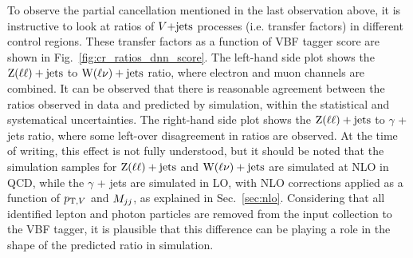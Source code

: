To observe the partial cancellation mentioned in the last observation above, it is instructive to
look at ratios of $V\text{+jets}$ processes (i.e. transfer factors) in different control regions.
These transfer factors as a function of VBF tagger score are shown in
Fig.~\ref{fig:cr_ratios_dnn_score}. The left-hand side plot shows the $\mathrm{Z}(\ell\ell)+\textrm{jets}$ to $\mathrm{W}(\ell\nu)+\textrm{jets}$ ratio,
where electron and muon channels are combined. It can be observed that there is reasonable agreement between
the ratios observed in data and predicted by simulation, within the statistical and systematical uncertainties.
The right-hand side plot shows the $\mathrm{Z}(\ell\ell)+\textrm{jets}$ to $\gamma$ + jets ratio, where some left-over disagreement in ratios
are observed. At the time of writing, this effect is not fully understood, but it should be noted that 
the simulation samples for $\mathrm{Z}(\ell\ell)+\textrm{jets}$ and $\mathrm{W}(\ell\nu)+\textrm{jets}$ are simulated at NLO in QCD, while the $\gamma$ + jets are
simulated in LO, with NLO corrections applied as a function of $p_{\mathrm{T},V}$ and $M_{jj}$, as explained in Sec.~\ref{sec:nlo}.
Considering that all identified lepton and photon particles are removed from the input collection to the VBF tagger,
it is plausible that this difference can be playing a role in the shape of the predicted ratio in simulation. 

